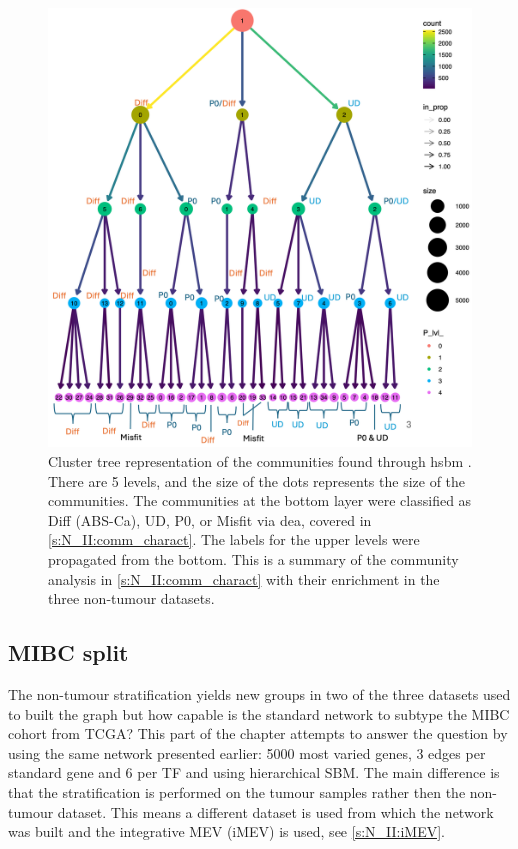 \begin{figure}[H]    
    \centering
    \includegraphics[width=1.0\textwidth,keepaspectratio]{Sections/Network_II/resources/non_tum/clustertree_labels.png}
    \caption[Cluster tree: non-tumour and bladder differentiation]{Cluster tree representation of the communities found through \acrshort{hsbm} \citep{Peixoto2014-yb}. There are 5 levels, and the size of the dots represents the size of the communities. The communities at the bottom layer were classified as Diff (ABS-Ca), UD, P0, or Misfit via \acrfull{dea}, covered in \cref{s:N_II:comm_charact}. The labels for the upper levels were propagated from the bottom. This is a summary of the community analysis in \cref{s:N_II:comm_charact} with their enrichment in the three non-tumour datasets.}
    \label{fig:N_II:cluster_tree}
\end{figure}



% 
\subsection{MIBC split} \label{s:N_II:tum_split}

The non-tumour stratification yields new groups in two of the three datasets used to built the graph but how capable is the standard network to subtype the MIBC cohort from TCGA? This part of the chapter attempts to answer the question by using the same network presented earlier: 5000 most varied genes, 3 edges per standard gene and 6 per TF and using hierarchical SBM. The main difference is that the stratification is performed on the tumour samples rather then the non-tumour dataset. This means a different dataset is used from which the network was built and the integrative MEV (iMEV) is used, see \cref{s:N_II:iMEV}.

